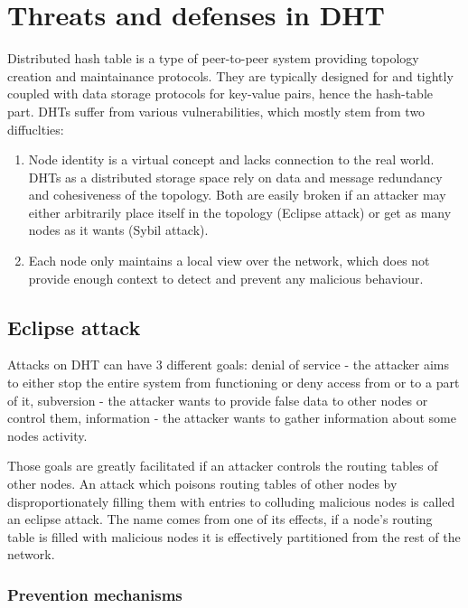 \chapter{Threats and defenses in DHT}
  Distributed hash table is a type of peer-to-peer system providing topology
  creation and maintainance protocols. They are typically designed for and
  tightly coupled with data storage protocols for key-value pairs, hence the
  hash-table part. DHTs suffer from various vulnerabilities, which mostly stem
  from two diffuclties:
  \begin{enumerate}
    \item Node identity is a virtual concept and lacks connection to the real
      world. DHTs as a distributed storage space rely on data and message
      redundancy and cohesiveness of the topology. Both are easily broken if an
      attacker may either arbitrarily place itself in the topology (Eclipse
      attack) or get as many nodes as it wants (Sybil attack).

    \item Each node only maintains a local view over the network, which does not
      provide enough context to detect and prevent any malicious behaviour.
  \end{enumerate}

\section{Eclipse attack}
  Attacks on DHT can have 3 different goals:
  denial of service - the attacker aims to either stop the entire system from
  functioning or deny access from or to a part of it,
  subversion - the attacker wants to provide false data to other nodes or
  control them,
  information - the attacker wants to gather information about some nodes
  activity.

  Those goals are greatly facilitated if an attacker controls the routing tables
  of other nodes. An attack which poisons routing tables of other nodes by
  disproportionately filling them with entries to colluding malicious nodes is
  called an eclipse attack. The name comes from one of its effects, if a node's
  routing table is filled with malicious nodes it is effectively partitioned
  from the rest of the network.

  \subsection{Prevention mechanisms}

